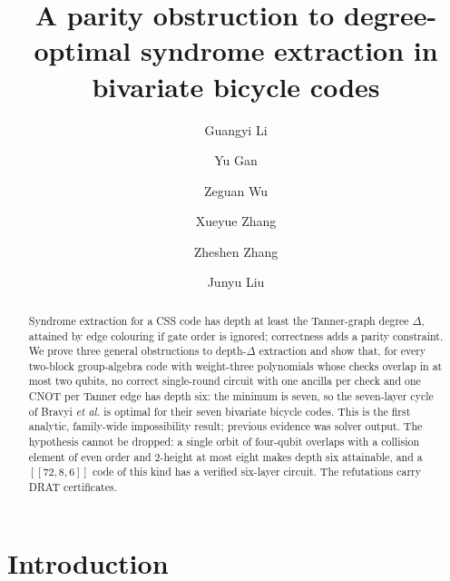 \documentclass[reprint,twocolumn,superscriptaddress,nofootinbib]{revtex4-2}
\theoremstyle{plain}
\begin{document}
\title{A parity obstruction to degree-optimal syndrome extraction in bivariate bicycle codes}

\author{Guangyi Li}
\author{Yu Gan}
\author{Zeguan Wu}
\author{Xueyue Zhang}
\author{Zheshen Zhang}
\author{Junyu Liu}

\begin{abstract}
Syndrome extraction for a CSS code has depth at least the Tanner-graph
degree $\Delta$, attained by edge colouring if gate order is ignored;
correctness adds a parity constraint. We prove three
general obstructions to depth-$\Delta$
extraction and show that, for every two-block group-algebra code with
weight-three polynomials whose checks overlap in at most two qubits, no
correct single-round circuit with one ancilla per check and one CNOT per
Tanner edge has depth six: the minimum is seven, so the seven-layer cycle
of Bravyi \emph{et al.} is optimal for their seven bivariate bicycle
codes. This is the first analytic, family-wide impossibility result;
previous evidence was solver output. The hypothesis cannot be dropped: a
single orbit of four-qubit overlaps with a collision element of even order
and $2$-height at most eight makes depth six attainable, and a
$[[72,8,6]]$ code of this kind has a verified six-layer circuit. The
refutations carry DRAT certificates.
\end{abstract}

\maketitle

\section{Introduction}
\label{sec:intro}
\end{document}
